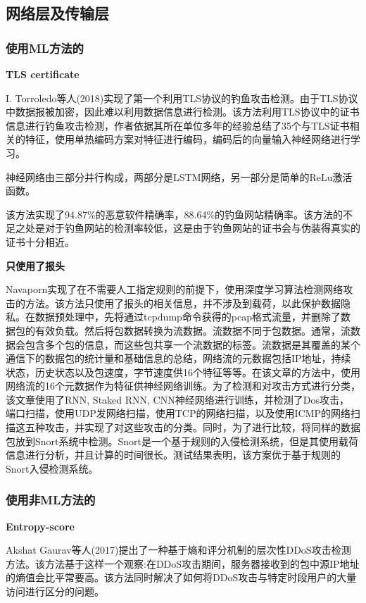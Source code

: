 \documentclass[12pt]{article} %
\begin{document}
\subsection{网络层及传输层}
\label{ip}

\subsubsection{使用ML方法的}
\label{ml}

\textbf{TLS certificate}

I. Torroledo等人(2018)实现了第一个利用TLS协议的钓鱼攻击检测。由于TLS协议中数据报被加密，因此难以利用数据信息进行检测。该方法利用TLS协议中的证书信息进行钓鱼攻击检测，作者依据其所在单位多年的经验总结了35个与TLS证书相关的特征，使用单热编码方案对特征进行编码，编码后的向量输入神经网络进行学习。

神经网络由三部分并行构成，两部分是LSTM网络，另一部分是简单的ReLu激活函数。

该方法实现了94.87\%的恶意软件精确率，88.64\%的钓鱼网站精确率。该方法的不足之处是对于钓鱼网站的检测率较低，这是由于钓鱼网站的证书会与伪装得真实的证书十分相近。

\textbf{只使用了报头}

Navaporn实现了在不需要人工指定规则的前提下，使用深度学习算法检测网络攻击的方法。该方法只使用了报头的相关信息，并不涉及到载荷，以此保护数据隐私。在数据预处理中，先将通过tcpdump命令获得的pcap格式流量，并删除了数据包的有效负载。然后将包数据转换为流数据。流数据不同于包数据。通常，流数据会包含多个包的信息，而这些包共享一个流数据的标签。流数据是其覆盖的某个通信下的数据包的统计量和基础信息的总结，网络流的元数据包括IP地址，持续状态，历史状态以及包速度，字节速度供16个特征等等。在该文章的方法中，使用网络流的16个元数据作为特征供神经网络训练。为了检测和对攻击方式进行分类，该文章使用了RNN, Staked RNN, CNN神经网络进行训练，并检测了Dos攻击， 端口扫描，使用UDP发网络扫描，使用TCP的网络扫描，以及使用ICMP的网络扫描这五种攻击，并实现了对这些攻击的分类。同时，为了进行比较，将同样的数据包放到Snort系统中检测。Snort是一个基于规则的入侵检测系统，但是其使用载荷信息进行分析，并且计算的时间很长。测试结果表明，该方案优于基于规则的Snort入侵检测系统。

\subsubsection{使用非ML方法的}
\label{nonml}

\textbf{Entropy-score}

Akshat Gaurav等人(2017)提出了一种基于熵和评分机制的层次性DDoS攻击检测方法。该方法基于这样一个观察:在DDoS攻击期间，服务器接收到的包中源IP地址的熵值会比平常要高。该方法同时解决了如何将DDoS攻击与特定时段用户的大量访问进行区分的问题。
\end{document}
